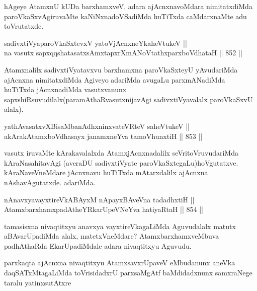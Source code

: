 \begin{artha}
hAgeye AtamxnU kUDa barxhamxveV, adara ajAcnxnavoMdara nimitatxdiMda paroVkaSxvAgiruvaMte kaNiNxnadoVSadiMda huTiTxda caMdarxnaMte adu toVrutatxde.
\end{artha}

\begin{shl}
sadivxtiVyaparoVkaSxtevxV yatoV\s jAcnxneYkaheVtukeV || \\
na vasutx sapxqqshatasatxsAmxtapxrXmANoVtathxparxboVdhataH \hfill || 852 ||  
\end{shl}

\begin{artha}
Atamxnalilx sadivxtiVyatavxvu barxhamxna paroVkaSxteyU yAvudariMda ajAcnxna nimitatxdiMda Agiveyo adariMda avugaLu parxmANadiMda huTiTxda jAcnxnadiMda vasutxvanunx sapxshiRsuvudilalx(paramAthaRvasutx\-\break nijavAgi sadivxtiVyavalalx paroVkaSxvU alalx).
\end{artha}

\begin{shl}
yathAvasatxvXBisaMbanAdhxninxvateVRteV saheVtukeV || \\
akArakAtamxboVdhasayx janamxneYva tamoVhunxtiH \hfill || 853 ||  
\end{shl}

\begin{artha}
vasutx iruvaMte kArakavalalxda AtamxjAcnxnadalilx seVritoVruvudariMda kAraNasahitavAgi (averaDU sadivxtiVyate paroVkaSxtegaLu)\break hoVgutatxve. kAraNaveVneMdare jAcnxnavu huTiTxda mAtarxdalilx ajAcnxna nAshavAgutatxde. adariMda.
\end{artha}


\begin{shl}
nAnavxyavayxtireVkABAyxM nApayxBAveVna tadadhxtiH || \\
AtamxbarxhamxpadAtheYRkarUpeVNeYva hatiyaRtaH \hfill || 854 ||  
\end{shl}

\begin{artha}
tamasisxna nivaqtitxyu anavxya vayxtireVkagaLiMda Aguvudalalx matutx aBAvarUpadiMda alalx, matetxVneMdare? AtamxbarxhamxveMbuva padhAthaRda EkarUpadiMdale adara nivaqtitxyu Aguvudu.
\end{artha}

\begin{artha}
parxkaqta ajAcnxna nivaqtitxyu AtamxsavxrUpaveV eMbudanunx aneVka daqSATxMtagaLiMda toVrisidadxrU parxsaMgAtf baMdidadxnunx samxraNege taralu yatinxsutAtxre\ndash 
\end{artha}

